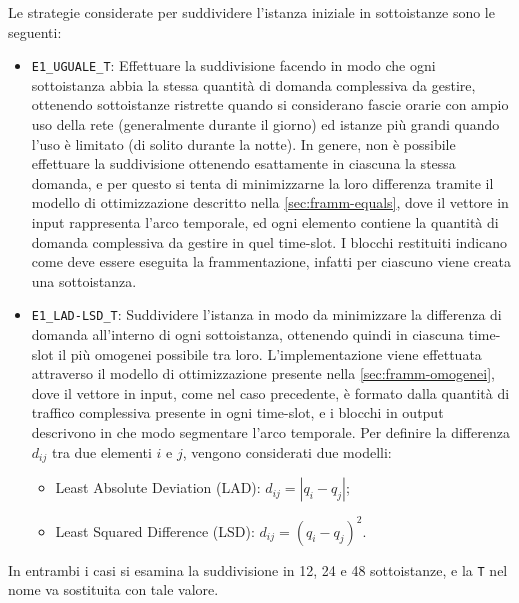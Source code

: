Le strategie considerate per suddividere l'istanza iniziale in sottoistanze sono le seguenti:
\begin{itemize}
    \item \texttt{E1\_UGUALE\_T}: Effettuare la suddivisione facendo in modo che ogni sottoistanza abbia la stessa quantità di domanda complessiva da gestire, ottenendo sottoistanze ristrette quando si considerano fascie orarie con ampio uso della rete (generalmente durante il giorno) ed istanze più grandi quando l'uso è limitato (di solito durante la notte). In genere, non è possibile effettuare la suddivisione ottenendo esattamente in ciascuna la stessa domanda, e per questo si tenta di minimizzarne la loro differenza tramite il modello di ottimizzazione descritto nella \autoref{sec:framm-equals}, dove il vettore in input rappresenta l'arco temporale, ed ogni elemento contiene la quantità di domanda complessiva da gestire in quel time-slot. I blocchi restituiti indicano come deve essere eseguita la frammentazione, infatti per ciascuno viene creata una sottoistanza.

    \item \texttt{E1\_LAD-LSD\_T}: Suddividere l'istanza in modo da minimizzare la differenza di domanda all'interno di ogni sottoistanza, ottenendo quindi in ciascuna time-slot il più omogenei possibile tra loro. L'implementazione viene effettuata attraverso il modello di ottimizzazione presente nella \autoref{sec:framm-omogenei}, dove il vettore in input, come nel caso precedente, è formato dalla quantità di traffico complessiva presente in ogni time-slot, e i blocchi in output descrivono in che modo segmentare l'arco temporale. Per definire la differenza $d_{ij}$ tra due elementi $i$ e $j$, vengono considerati due modelli:
    \begin{itemize}
        \item Least Absolute Deviation (LAD): $d_{ij} = |q_i - q_j|$;
        \item Least Squared Difference (LSD): $d_{ij} = (q_i - q_j)^2$.
    \end{itemize}
\end{itemize}
In entrambi i casi si esamina la suddivisione in 12, 24 e 48 sottoistanze, e la \texttt{T} nel nome va sostituita con tale valore.


